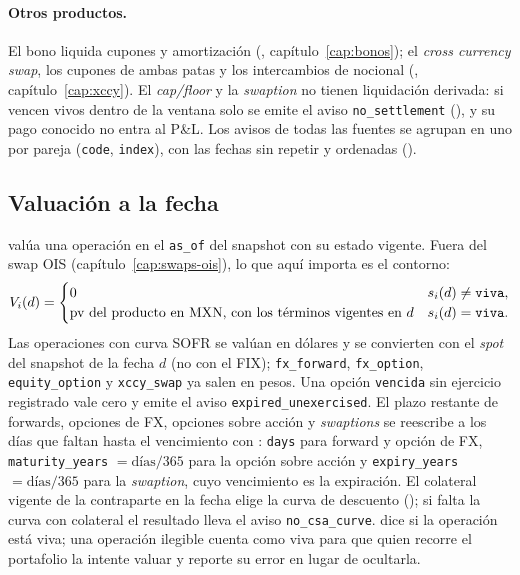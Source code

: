 \paragraph{Otros productos.} El bono liquida cupones y amortización (, capítulo~\ref{cap:bonos}); el \emph{cross currency swap}, los cupones de ambas patas y los intercambios de nocional (, capítulo~\ref{cap:xccy}). El \emph{cap/floor} y la \emph{swaption} no tienen liquidación derivada: si vencen vivos dentro de la ventana solo se emite el aviso \texttt{no\_settlement} (), y su pago conocido no entra al P\&L. Los avisos de todas las fuentes se agrupan en uno por pareja (\texttt{code}, \texttt{index}), con las fechas sin repetir y ordenadas ().

\subsection{Valuación a la fecha}\label{sec:cap08-valuacion}

 valúa una operación en el \texttt{as\_of} del snapshot con su estado vigente. Fuera del swap OIS (capítulo~\ref{cap:swaps-ois}), lo que aquí importa es el contorno:
\begin{equation}\label{eq:cap08-pv}
  V_i(d) =
  \begin{cases}
    0 & s_i(d) \ne \texttt{viva},\\
    \text{pv del producto en \textup{MXN}, con los términos vigentes en } d & s_i(d) = \texttt{viva}.
  \end{cases}
\end{equation}
Las operaciones con curva SOFR se valúan en dólares y se convierten con el \emph{spot} del snapshot de la fecha $d$ (no con el FIX); \texttt{fx\_forward}, \texttt{fx\_option}, \texttt{equity\_option} y \texttt{xccy\_swap} ya salen en pesos. Una opción \texttt{vencida} sin ejercicio registrado vale cero y emite el aviso \texttt{expired\_unexercised}. El plazo restante de forwards, opciones de FX, opciones sobre acción y \emph{swaptions} se reescribe a los días que faltan hasta el vencimiento con : \texttt{days} para forward y opción de FX, \texttt{maturity\_years} $= \text{días}/365$ para la opción sobre acción y \texttt{expiry\_years} $= \text{días}/365$ para la \emph{swaption}, cuyo vencimiento es la expiración. El colateral vigente de la contraparte en la fecha elige la curva de descuento (); si falta la curva con colateral el resultado lleva el aviso \texttt{no\_csa\_curve}.  dice si la operación está viva; una operación ilegible cuenta como viva para que quien recorre el portafolio la intente valuar y reporte su error en lugar de ocultarla.

